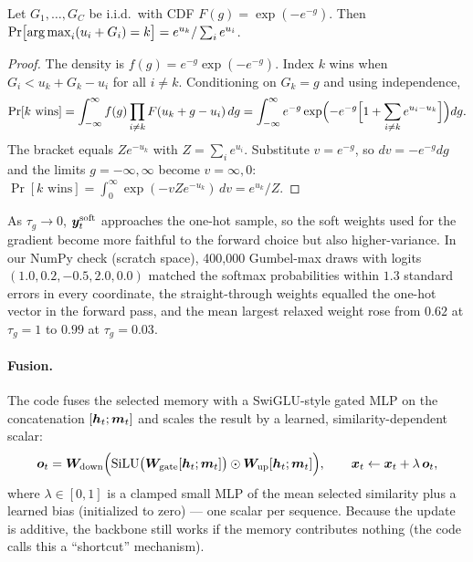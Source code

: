 \begin{proposition}\label{prop:c10-gumbel}
Let $G_1,\dots,G_C$ be i.i.d.\ with CDF $F(g) = \exp(-e^{-g})$. Then
$\Pr\bigl[\operatorname*{arg\,max}_i (u_i + G_i) = k\bigr] = e^{u_k}/\sum_i e^{u_i}$.
\end{proposition}
\begin{proof}
The density is $f(g) = e^{-g}\exp(-e^{-g})$. Index $k$ wins when $G_i < u_k + G_k - u_i$ for all
$i \ne k$. Conditioning on $G_k = g$ and using independence,
\[
  \Pr[k \text{ wins}] = \int_{-\infty}^{\infty} f(g) \prod_{i\ne k} F(u_k + g - u_i)\, dg
  = \int_{-\infty}^{\infty} e^{-g} \exp\Bigl(-e^{-g}\Bigl[1 + \sum_{i \ne k} e^{u_i - u_k}\Bigr]\Bigr) dg .
\]
The bracket equals $Z e^{-u_k}$ with $Z = \sum_i e^{u_i}$. Substitute $v = e^{-g}$, so
$dv = -e^{-g}dg$ and the limits $g = -\infty, \infty$ become $v = \infty, 0$:
$\Pr[k \text{ wins}] = \int_0^\infty \exp(-v Z e^{-u_k})\, dv = e^{u_k}/Z$.
\end{proof}

As $\tau_g \to 0$, $\bm{y}^{\mathrm{soft}}_t$ approaches the one-hot sample, so the soft weights used
for the gradient become more faithful to the forward choice but also higher-variance. In our NumPy
check (scratch space), 400{,}000 Gumbel-max draws with logits $(1.0, 0.2, -0.5, 2.0, 0.0)$ matched
the softmax probabilities within $1.3$ standard errors in every coordinate, the straight-through
weights equalled the one-hot vector in the forward pass, and the mean largest relaxed weight rose
from $0.62$ at $\tau_g = 1$ to $0.99$ at $\tau_g = 0.03$.

\paragraph{Fusion.} The code fuses the selected memory with a SwiGLU-style gated MLP on the
concatenation $[\bm{h}_t; \bm{m}_t]$ and scales the result by a learned, similarity-dependent scalar:
\begin{equation}
  \bm{o}_t = \bm{W}_{\mathrm{down}}\Bigl(\operatorname{SiLU}\bigl(\bm{W}_{\mathrm{gate}}[\bm{h}_t;\bm{m}_t]\bigr) \odot
  \bm{W}_{\mathrm{up}}[\bm{h}_t;\bm{m}_t]\Bigr),\qquad
  \bm{x}_t \gets \bm{x}_t + \lambda\, \bm{o}_t ,
  \label{eq:c10-explicit-fuse}
\end{equation}
where $\lambda \in [0,1]$ is a clamped small MLP of the mean selected similarity plus a learned
bias (initialized to zero) --- one scalar per sequence. Because the update is additive, the
backbone still works if the memory contributes nothing (the code calls this a ``shortcut''
mechanism).

